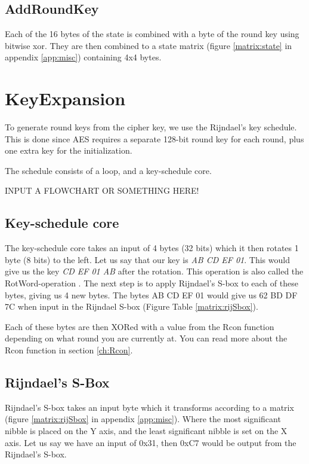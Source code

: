 \subsection{AddRoundKey}
Each of the 16 bytes of the state is combined with a byte of the round key 
using bitwise xor. They are then combined to a state matrix (figure 
\ref{matrix:state} in appendix \ref{app:misc}) containing 4x4 bytes.

\section{KeyExpansion}\label{sec:KeySch}
To generate round keys from the cipher key, we use the Rijndael's key schedule. 
This is done since AES requires a separate 128-bit round key for each round, 
plus one extra key for the initialization.

The schedule consists of a loop, and a key-schedule core.

INPUT A FLOWCHART OR SOMETHING HERE!

\subsection{Key-schedule core}
The key-schedule core takes an input of 4 bytes (32 bits) which it then rotates 
1 byte (8 bits) to the left. Let us say that our key is \emph{AB CD EF 01}. This 
would give us the key \emph{CD EF 01 AB} after the rotation. This operation is 
also called the RotWord-operation \citep[p. 107]{Stinson:2006}. The next step is 
to apply Rijndael's S-box to each of these bytes, giving us 4 new bytes. The 
bytes {AB CD EF 01} would give us {62 BD DF 7C} when input in the Rijndael 
S-box (Figure Table \ref{matrix:rijSbox}).

Each of these bytes are then XORed with a value from the Rcon function depending 
on what round you are currently at. You can read more about the Rcon function in 
section \ref{ch:Rcon}.

\subsection{Rijndael's S-Box}
Rijndael's S-box takes an input byte which it transforms according to a matrix 
(figure \ref{matrix:rijSbox} in appendix \ref{app:misc}). Where the most 
significant nibble is placed on the Y axis, and the least significant nibble 
is set on the X axis. Let us say we have an input of 0x31, then 0xC7 would be 
output from the Rijndael's S-box.


